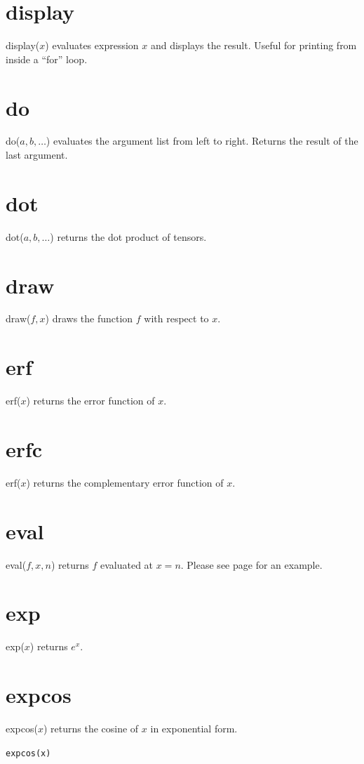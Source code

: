 \documentclass[12pt,openany]{report}
\begin{document}
\section*{display}
display($x$) evaluates expression $x$ and displays the result.
Useful for printing from inside a ``for'' loop.

\section*{do}
do($a,b,\ldots$) evaluates the argument list from left to right.
Returns the result of the last argument.

\section*{dot}
dot($a,b,\ldots$) returns the dot product of tensors.

\section*{draw}
draw($f,x$) draws the function $f$ with respect to $x$.

\section*{erf}
erf($x$) returns the error function of $x$.

\section*{erfc}
erf($x$) returns the complementary error function of $x$.

\section*{eval}
eval($f,x,n$) returns $f$ evaluated at $x=n$.
Please see page \pageref{integral} for an example.

\section*{exp}
exp($x$) returns $e^x$.

\section*{expcos}
expcos($x$) returns the cosine of $x$ in exponential form.

\medskip
{\tt expcos(x)}
\end{document}
